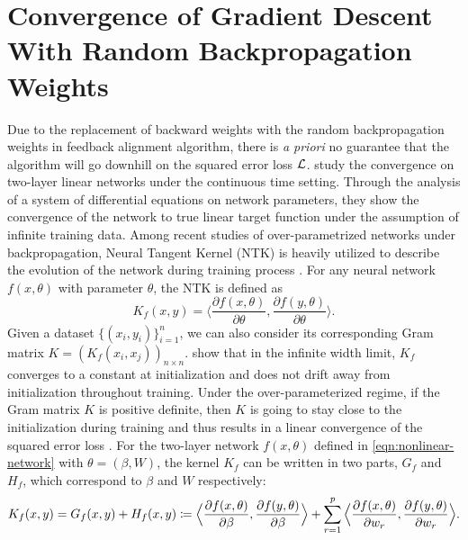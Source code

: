 
\section{Convergence of Gradient Descent With Random Backpropagation Weights}

Due to the replacement of backward weights with the random backpropagation weights in feedback alignment algorithm, there is \emph{a priori} no guarantee that the algorithm will go downhill on the squared error loss $\mathcal{L}$. \citet{lillicrap2020backpropagation} study the convergence on two-layer linear networks under the continuous time setting. Through the analysis of a system of differential equations on network parameters, they show the convergence of the network to true linear target function under the assumption of infinite training data.
Among recent studies of over-parametrized networks under backpropagation, Neural Tangent Kernel (NTK) is heavily utilized to describe the evolution of the network during training process \citep{jacot2018neural}. For any neural network $f(x,\theta)$ with parameter $\theta$, the NTK is defined as
\begin{equation}
	K_f(x,y) = \Big\langle \frac{\partial f (x,\theta)}{\partial \theta},\frac{\partial f (y,\theta)}{\partial \theta}\Big\rangle.
\end{equation}
Given a dataset $\{(x_i,y_i)\}_{i=1}^n$, we can also consider its corresponding Gram matrix $K = (K_f(x_i,x_j))_{n\times n}$. \citet{jacot2018neural} show that in the infinite width limit, $K_f$ converges to a constant at initialization and does not drift away from initialization throughout training. Under the over-parameterized regime, if the Gram matrix $K$ is positive definite, then $K$ is going to stay close to the initialization during training and thus results in a linear convergence of the squared error loss \citep{du2018gradient,du2019gradient,gao2020model}.
For the two-layer network $f(x, \theta)$ defined in \eqref{eqn:nonlinear-network} with $\theta = (\beta,W)$, the kernel $K_f$ can be written in two parts, $G_f$ and $H_f$, which correspond to $\beta$ and $W$ respectively:
\begin{equation}
K_f(x,y) = G_f(x, y) + H_f(x,y) \coloneqq \Big\langle \frac{\partial f (x,\theta)}{\partial \beta},\frac{\partial f (y,\theta)}{\partial \beta}\Big\rangle + \sum_{r=1}^p\Big\langle \frac{\partial f (x,\theta)}{\partial w_r},\frac{\partial f (y,\theta)}{\partial w_r}\Big\rangle.
\end{equation}
